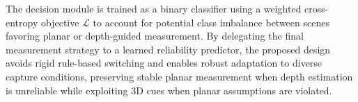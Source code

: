 \documentclass{article}
\begin{document}
The decision module is trained as a binary classifier using a weighted cross-entropy objective $\mathcal{L}$ to account for potential class imbalance between scenes favoring planar or depth-guided measurement. By delegating the final measurement strategy to a learned reliability predictor, the proposed design avoids rigid rule-based switching and enables robust adaptation to diverse capture conditions, preserving stable planar measurement when depth estimation is unreliable while exploiting 3D cues when planar assumptions are violated.






\vspace{-0.3cm}
\end{document}
